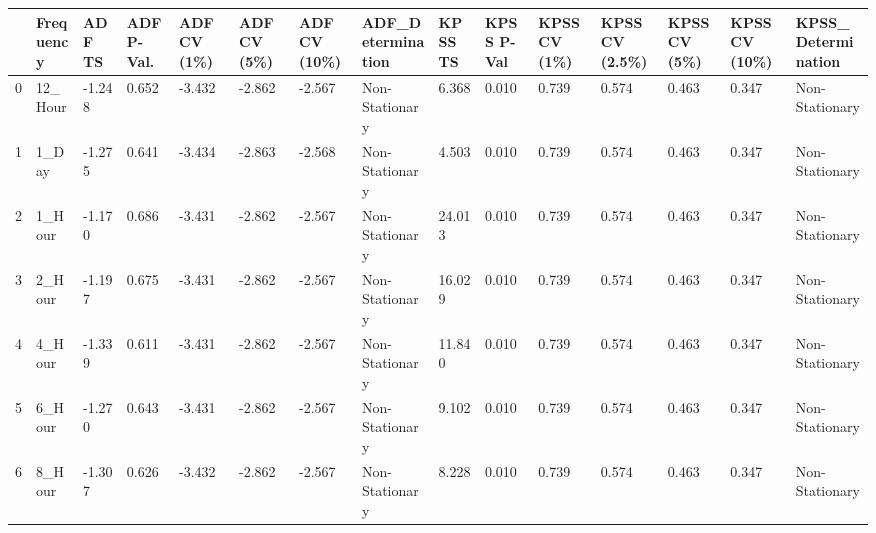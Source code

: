 \begin{tabular}{lllllllllllllll}
\toprule
 & Frequency & ADF TS & ADF P-Val. & ADF CV (1\%) & ADF CV (5\%) & ADF CV (10\%) & ADF_Determination & KPSS TS & KPSS P-Val & KPSS CV (1\%) & KPSS CV (2.5\%) & KPSS CV (5\%) & KPSS CV (10\%) & KPSS_Determination \\
\midrule
0 & 12_Hour & -1.248 & 0.652 & -3.432 & -2.862 & -2.567 & Non-Stationary & 6.368 & 0.010 & 0.739 & 0.574 & 0.463 & 0.347 & Non-Stationary \\
1 & 1_Day & -1.275 & 0.641 & -3.434 & -2.863 & -2.568 & Non-Stationary & 4.503 & 0.010 & 0.739 & 0.574 & 0.463 & 0.347 & Non-Stationary \\
2 & 1_Hour & -1.170 & 0.686 & -3.431 & -2.862 & -2.567 & Non-Stationary & 24.013 & 0.010 & 0.739 & 0.574 & 0.463 & 0.347 & Non-Stationary \\
3 & 2_Hour & -1.197 & 0.675 & -3.431 & -2.862 & -2.567 & Non-Stationary & 16.029 & 0.010 & 0.739 & 0.574 & 0.463 & 0.347 & Non-Stationary \\
4 & 4_Hour & -1.339 & 0.611 & -3.431 & -2.862 & -2.567 & Non-Stationary & 11.840 & 0.010 & 0.739 & 0.574 & 0.463 & 0.347 & Non-Stationary \\
5 & 6_Hour & -1.270 & 0.643 & -3.431 & -2.862 & -2.567 & Non-Stationary & 9.102 & 0.010 & 0.739 & 0.574 & 0.463 & 0.347 & Non-Stationary \\
6 & 8_Hour & -1.307 & 0.626 & -3.432 & -2.862 & -2.567 & Non-Stationary & 8.228 & 0.010 & 0.739 & 0.574 & 0.463 & 0.347 & Non-Stationary \\
\bottomrule
\end{tabular}
